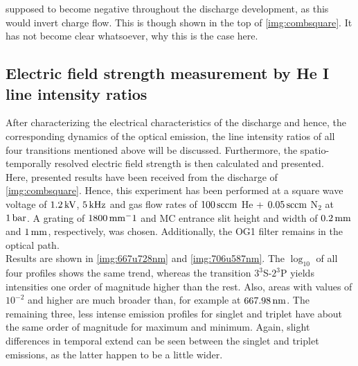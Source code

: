 \documentclass[a4paper,10pt,twoside]{article}
\newcommand{\tenpo}[1]{ 10^{#1}}
\newcommand{\ix}[1]{_\text{#1}}
\begin{document}
	\begin{multicols*}{2}
		
		supposed to become negative throughout the discharge development, as this would invert charge flow. This is though shown in the top of \autoref{img:combsquare}. It has not become clear whatsoever, why this is the case here.
		
		\subsection{Electric field strength measurement by He I line intensity ratios}
		
		After characterizing the electrical characteristics of the discharge and hence, the corresponding dynamics of the optical emission, the line intensity ratios of all four transitions mentioned above will be discussed. Furthermore, the spatio-temporally resolved electric field strength is then calculated and presented.\\
		Here, presented results have been received from the discharge of \autoref{img:combsquare}. Hence, this experiment has been performed at a square wave voltage of $\unit[1.2]{kV}$, $\unit[5]{kHz}$ and gas flow rates of $\unit[100]{sccm}$ He + $\unit[0.05]{sccm}$ N$_2$ at $\unit[1]{bar}$. A grating of $\unit[1800]{mm^-1}$ and MC entrance slit height and width of $\unit[0.2]{mm}$ and $\unit[1]{mm}$, respectively, was chosen. Additionally, the OG1 filter remains in the optical path.\\
		Results are shown in \autoref{img:667u728nm} and \autoref{img:706u587nm}. The $\log\ix{10}$ of all four profiles shows the same trend, whereas the transition $3^3$S-$2^3$P yields intensities one order of magnitude higher than the rest. Also, areas with values of $\tenpo{-2}$ and higher are much broader than, for example at $\unit[667.98]{nm}$. The remaining three, less intense emission profiles for singlet and triplet have about the same order of magnitude for maximum and minimum. Again, slight differences in temporal extend can be seen between the singlet and triplet emissions, as the latter happen to be a little wider.\\

\end{multicols*}
\end{document}
